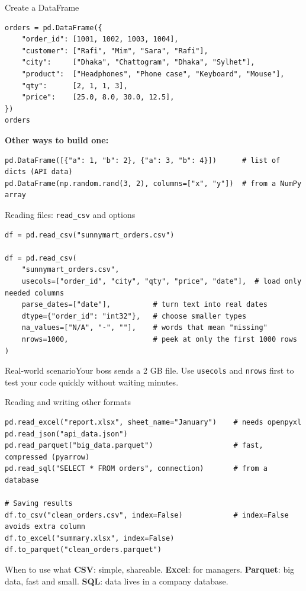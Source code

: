\documentclass[aspectratio=169,10pt]{beamer}
\newcommand{\code}[1]{\texttt{#1}}
\newcommand{\scenario}[1]{\begin{exampleblock}{Real-world scenario}#1\end{exampleblock}}
\begin{document}
\begin{frame}[fragile]{Create a DataFrame}
\begin{lstlisting}
orders = pd.DataFrame({
    "order_id": [1001, 1002, 1003, 1004],
    "customer": ["Rafi", "Mim", "Sara", "Rafi"],
    "city":     ["Dhaka", "Chattogram", "Dhaka", "Sylhet"],
    "product":  ["Headphones", "Phone case", "Keyboard", "Mouse"],
    "qty":      [2, 1, 1, 3],
    "price":    [25.0, 8.0, 30.0, 12.5],
})
orders
\end{lstlisting}
\textbf{Other ways to build one:}
\begin{lstlisting}
pd.DataFrame([{"a": 1, "b": 2}, {"a": 3, "b": 4}])      # list of dicts (API data)
pd.DataFrame(np.random.rand(3, 2), columns=["x", "y"])  # from a NumPy array
\end{lstlisting}
\end{frame}

\begin{frame}[fragile]{Reading files: \texttt{read\_csv} and options}
\begin{lstlisting}
df = pd.read_csv("sunnymart_orders.csv")

df = pd.read_csv(
    "sunnymart_orders.csv",
    usecols=["order_id", "city", "qty", "price", "date"],  # load only needed columns
    parse_dates=["date"],          # turn text into real dates
    dtype={"order_id": "int32"},   # choose smaller types
    na_values=["N/A", "-", ""],    # words that mean "missing"
    nrows=1000,                    # peek at only the first 1000 rows
)
\end{lstlisting}
  \scenario{Your boss sends a 2 GB file. Use \code{usecols} and \code{nrows} first to test
  your code quickly without waiting minutes.}
\end{frame}

\begin{frame}[fragile]{Reading and writing other formats}
\begin{lstlisting}
pd.read_excel("report.xlsx", sheet_name="January")    # needs openpyxl
pd.read_json("api_data.json")
pd.read_parquet("big_data.parquet")                   # fast, compressed (pyarrow)
pd.read_sql("SELECT * FROM orders", connection)       # from a database

# Saving results
df.to_csv("clean_orders.csv", index=False)            # index=False avoids extra column
df.to_excel("summary.xlsx", index=False)
df.to_parquet("clean_orders.parquet")
\end{lstlisting}
  \begin{block}{When to use what}
    \textbf{CSV}: simple, shareable. \textbf{Excel}: for managers. \textbf{Parquet}: big data,
    fast and small. \textbf{SQL}: data lives in a company database.
  \end{block}
\end{frame}
\end{document}
